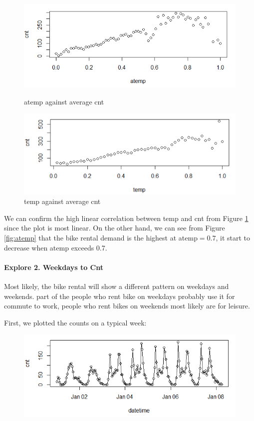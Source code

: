 \documentclass[12pt]{article}
\begin{document}
	\begin{figure}[H]
		\centering
		\begin{minipage}{.44\textwidth}
			\centering
			\includegraphics[width=\linewidth]{figures/atemp_cnt.png}
			\caption{atemp against average cnt}
			\label{fig:atemp}
		\end{minipage}%
		\begin{minipage}{.44\textwidth}
			\centering
			\includegraphics[width=\linewidth]{figures/temp_cnt.png}
			\caption{temp against average cnt}
			\label{fig:temp}
		\end{minipage}
	\end{figure}
   We can confirm the high linear correlation between temp and cnt from Figure \ref{fig:temp} since the plot is most linear. On the other hand, we can see from Figure \ref{fig:atemp} that the bike rental demand is the highest at atemp$=0.7$, it start to decrease when atemp exceeds 0.7. 
	
	\paragraph*{Explore 2. Weekdays to Cnt} Most likely, the bike rental will show a different pattern on weekdays and weekends. part of the people who rent bike on weekdays probably use it for commute to work, people who rent bikes on weekends most likely are for leisure.
	
	First, we plotted the counts on a typical week:
	\begin{figure}[H]
		\centering
		\includegraphics[scale=.8]{figures/week_cnt.png}
	\end{figure}
	
\end{document}
